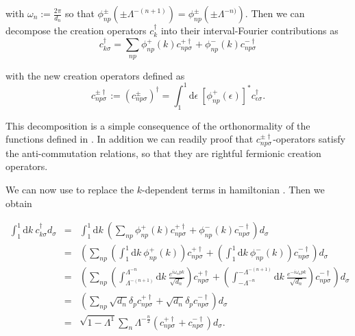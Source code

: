 with $\omega_{n}:=\frac{2\pi}{d_{n}}$ so that $\phi_{np}^{\pm}\left(\pm\Lambda^{-(n+1)}\right)=\phi_{np}^{\pm}\left(\pm\Lambda^{-n)}\right).$
Then we can decompose the creation operators $c_{k}^{\dagger}$ into
their interval-Fourier contributions as 
\begin{equation}
c_{k\sigma}^{\dagger}=\sum_{np}\phi_{np}^{+}(k)c_{np\sigma}^{+\dagger}+\phi_{np}^{-}(k)c_{np\sigma}^{-\dagger}\label{eq:Fourier-interval decomposition}
\end{equation}


with the new creation operators defined as 
\[
c_{np\sigma}^{\pm\dagger}:=\left(c_{np\sigma}^{\pm}\right)^{\dagger}=\int_{1}^{1}\mbox{d}\epsilon\ \left[\phi_{np}^{+}(\epsilon)\right]^{*}c_{\epsilon\sigma}^{\dagger}.
\]


This decomposition 
is a simple consequence of the orthonormality of the functions defined
in . In addition we can readily
proof that $c_{np\sigma}^{\pm\dagger}$-operators satisfy the anti-commutation
relations, so that they are rightful fermionic creation operators. 

We can now use  to replace
the $k$-dependent terms in hamiltonian .
Then we obtain

\begin{eqnarray}
\int_{1}^{1}\mbox{d}k\ c_{k\sigma}^{\dagger}d_{\sigma} & = & \int_{1}^{1}\mbox{d}k\ \left(\sum_{np}\phi_{np}^{+}(k)c_{np\sigma}^{+\dagger}+\phi_{np}^{-}(k)c_{np\sigma}^{-\dagger}\right)d_{\sigma}\nonumber \\
 & = & \left(\sum_{np}\left(\int_{1}^{1}\mbox{d}k\ \phi_{np}^{+}(k)\right)c_{np\sigma}^{+\dagger}+\left(\int_{1}^{1}\mbox{d}k\ \phi_{np}^{-}(k)\right)c_{np\sigma}^{-\dagger}\right)d_{\sigma}\nonumber \\
 & = & \left(\sum_{np}\left(\int_{\Lambda^{-(n+1)}}^{\Lambda^{-n}}\mbox{d}k\ \frac{e^{i\omega_{n}pk}}{\sqrt{d_{n}}}\right)c_{np\sigma}^{+\dagger}+\left(\int_{-\Lambda^{-n}}^{-\Lambda^{-(n+1)}}\mbox{d}k\ \frac{e^{-i\omega_{n}pk}}{\sqrt{d_{n}}}\right)c_{np\sigma}^{-\dagger}\right)d_{\sigma}\nonumber \\
 & = & \left(\sum_{np}\sqrt{d_{n}}\delta_{p}c_{np\sigma}^{+\dagger}+\sqrt{d_{n}}\delta_{p}c_{np\sigma}^{-\dagger}\right)d_{\sigma}\nonumber \\
 & = & \sqrt{1-\Lambda^{1}}\sum_{n}\Lambda^{-\frac{n}{2}}\left(c_{np\sigma}^{+\dagger}+c_{np\sigma}^{-\dagger}\right)d_{\sigma}.\label{eq:firt-Integral}
\end{eqnarray}


